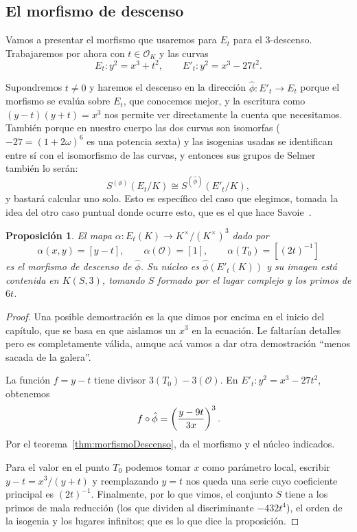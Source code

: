\documentclass[a4paper]{book}
\theoremstyle{definition}
\theoremstyle{plain}
\newtheorem{prop}[definition]{Proposición}
\newcommand{\nbd}{\nobreakdash}
\newcommand{\OO}{\mathcal{O}}
\newcommand{\KmodT}{K^\times/{(K^\times)}^3}
\newcommand{\lp}{\left\lparen}
\newcommand{\rp}{\right\rparen}
\begin{document}
\subsection{El morfismo de descenso}\label{sec:descensoFamilia}

Vamos a presentar el morfismo que usaremos para $E_t$ para el 3\nbd-descenso. Trabajaremos por ahora con $t\in\OO_K$ y las curvas
\[
E_t:y^2=x^3+t^2,\qquad E'_t:y^2=x^3-27t^2.
\]

Supondremos $t\neq0$ y haremos el descenso en la dirección $\hat\phi:E'_t\to E_t$ porque el morfismo se evalúa sobre $E_t$, que conocemos mejor, y la escritura como $(y-t)(y+t)=x^3$ nos permite ver directamente la cuenta que necesitamos. También porque en nuestro cuerpo las dos curvas son isomorfas ($-27={(1+2\omega)}^6$ es una potencia sexta) y las isogenias usadas se identifican entre sí con el isomorfismo de las curvas, y entonces sus grupos de Selmer también lo serán:
\[
S^{(\phi)}(E_t/K)\cong S^{(\hat\phi)}(E'_t/K),
\]
y bastará calcular uno solo. Esto es específico del caso que elegimos, tomada la idea del otro caso puntual donde ocurre esto, que es el que hace Savoie~\cite{Savoie2025QiRank2}.

\begin{prop}
El mapa $\alpha:E_t(K)\to \KmodT$ dado por
\[
\alpha(x,y)=[y-t],\qquad
\alpha(\OO)=[1],\qquad \alpha(T_0)=[{(2t)}^{-1}]
\]
es el morfismo de descenso de $\hat\phi$. Su núcleo es $\hat\phi(E'_t(K))$ y su imagen está contenida en $K(S,3)$, tomando $S$ formado por el lugar complejo y los primos de $6t$.
\end{prop}

\begin{proof}
Una posible demostración es la que dimos por encima en el inicio del capítulo, que se basa en que aislamos un $x^3$ en la ecuación. Le faltarían detalles pero es completamente válida, aunque acá vamos a dar otra demostración ``menos sacada de la galera''.

La función $f=y-t$ tiene divisor $3(T_0)-3(\OO)$. En $E'_t: y^2=x^3-27t^2$, obtenemos
\[
f\circ\hat\phi=\lp\frac{y-9t}{3x}\rp^3.
\]
Por el teorema~\ref{thm:morfismoDescenso}, da el morfismo y el núcleo indicados. 

Para el valor en el punto $T_0$ podemos tomar $x$ como parámetro local, escribir $y-t=x^3/(y+t)$ y reemplazando $y=t$ nos queda una serie cuyo coeficiente principal es ${(2t)}^{-1}$. Finalmente, por lo que vimos, el conjunto $S$ tiene a los primos de mala reducción (los que dividen al discriminante $-432t^4$), el orden de la isogenia y los lugares infinitos; que es lo que dice la proposición. 
\end{proof}
\end{document}
